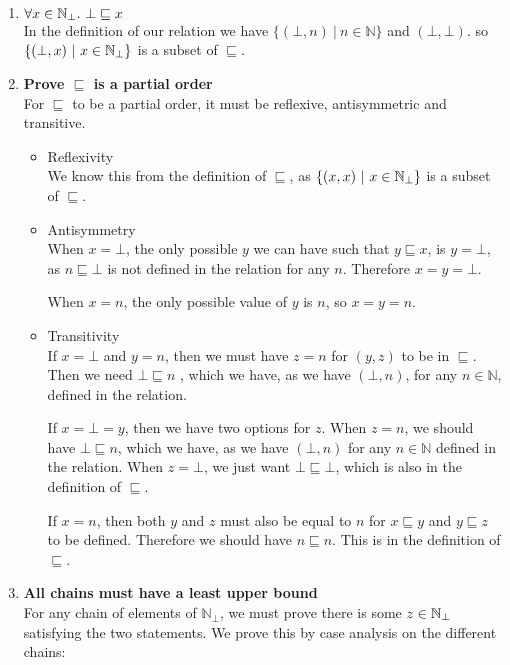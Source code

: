 \begin{enumerate}
\item{$\forall x \in \mathbb{N}_{\bot}. \ \bot \sqsubseteq x$ }\\
In the definition of our relation we have $\{ (\bot , n) \ | \ n \in \mathbb{N} \}$ and $(\bot , \bot)$. so $\{(\bot , x) \ | \ x \in \mathbb{N}_{\bot}\}$ is a subset of $\sqsubseteq$.
\item{\textbf{Prove $\sqsubseteq$ is a partial order}\\
For $\sqsubseteq$ to be a partial order, it must be reflexive, antisymmetric and transitive.
\begin{itemize}
\item{Reflexivity\\
We know this from the  definition of $\sqsubseteq$, as $\{(x,x) \ | \ x \in \mathbb{N}_{\bot} \}$ is a subset of $\sqsubseteq$.}
\item{Antisymmetry\\
When $x = \bot$, the only possible $y$ we can have such that $y \sqsubseteq x$, is $y = \bot$, as  $n \sqsubseteq \bot$ is not defined in the relation for any $n$. Therefore $x = y = \bot$.

When $x = n$, the only possible value of $y$ is $n$, so $x = y = n$.}
\item{Transitivity \\
If $x = \bot$ and $y =n$, then we must have $z = n$ for $(y,z)$ to be in $\sqsubseteq$. Then we need $\bot \sqsubseteq n$ , which we have, as we have $(\bot, n)$, for any $n \in \mathbb{N}$, defined in the relation. 

If $x = \bot = y$, then we have two options for $z$. When $z = n$, we should have $\bot \sqsubseteq n$, which we have, as we have $(\bot, n)$ for any $n \in \mathbb{N}$ defined in the relation. When $z = \bot$, we just want $ \bot \sqsubseteq \bot$, which is also in the definition of $\sqsubseteq$.

If $x = n$, then both $y$ and $z$ must also be equal to $n$ for $x \sqsubseteq y$ and $y \sqsubseteq z$ to be defined. Therefore we should  have $n \sqsubseteq n$. This is in the definition of $\sqsubseteq$.}
\end{itemize}}

\item{\textbf{All chains must have a least upper bound}\\
For any chain of elements of $\mathbb{N}_\bot$, we must prove there is some $z \in \mathbb{N}_{\bot}$ satisfying the two statements. We prove this by case analysis on the different chains:

}
\end{enumerate}
